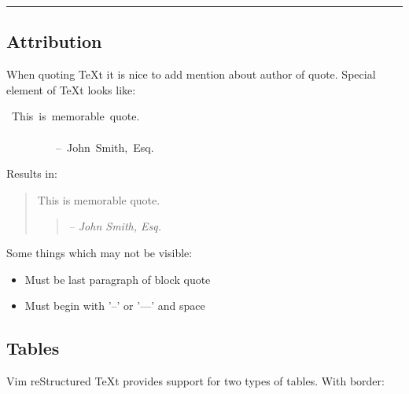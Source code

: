 \documentclass[12pt]{article}
\newcommand{\transition}{\begin{center}\rule{.8\textwidth}{0.2pt}\end{center}}
\newcommand{\attribution}[1]{\raggedleft\textit{#1}}
\begin{document}
\transition

\hypertarget{lattribution}{}
\subsection{Attribution}

When quoting \TeX{}t it is nice to add mention about author of quote. Special
element of \TeX{}t looks like:

\begin{ttfamily}\begin{flushleft}
\mbox{~This~is~memorable~quote.}\\
\mbox{}\\
\mbox{~~~~~~~~~--~John~Smith,~Esq.}\\
\end{flushleft}\end{ttfamily}

Results in:

 \begin{quotation}
 This is memorable quote.

 \begin{quotation}
 \attribution{-- John Smith, Esq.
 }
 \end{quotation}
 \end{quotation}

Some things which may not be visible:

 \begin{itemize}
\item
Must be last paragraph of block quote

\item
Must begin with '--' or '---' and space
\end{itemize}
\hypertarget{ltables}{}
\subsection{Tables}

Vim reStructured \TeX{}t provides support for two types of tables. With border:
\end{document}

